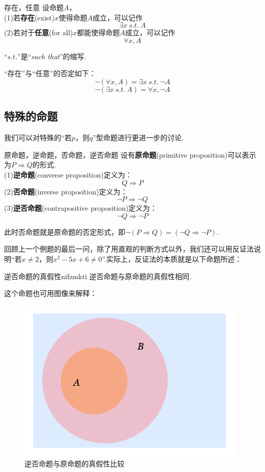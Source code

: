\documentclass[lang=cn, zihao=5]{elegantbook}
\begin{document}
\begin{definition}{存在，任意}
	设命题$A$， \\
	(1)若\textbf{存在}(exist)$x$使得命题$A$成立，可以记作$$\exists x~s.t.~A$$
	(2)若对于\textbf{任意}(for all)$x$都能使得命题$A$成立，可以记作$$\forall x,A$$
\end{definition}
\begin{remark}
	“$s.t.$”是“\textit{such that}”的缩写.
\end{remark}
\begin{remark}
	“存在”与“任意”的否定如下：
	$$\neg (\forall x,A) = \exists x~s.t.~\neg A$$
	$$\neg (\exists x~s.t.~A) = \forall x,\neg A$$
\end{remark}

\subsection{特殊的命题}

我们可以对特殊的“若$p$，则$q$”型命题进行更进一步的讨论.

\begin{definition}{原命题，逆命题，否命题，逆否命题}
	设有\textbf{原命题}(primitive proposition)可以表示为$P \Rightarrow Q$的形式. \\
	(1)\textbf{逆命题}(converse proposition)定义为：$$Q \Rightarrow P$$
	(2)\textbf{否命题}(inverse proposition)定义为：$$\neg P \Rightarrow \neg Q$$
	(3)\textbf{逆否命题}(contrapositive proposition)定义为：$$\neg Q \Rightarrow \neg P$$
\end{definition}
\begin{remark}
	此时否命题就是原命题的否定形式，即$\neg (P \Rightarrow Q) = (\neg Q \Rightarrow \neg P)$.
\end{remark}

回顾上一个例题的最后一问，除了用直观的判断方式以外，我们还可以用反证法说明“若$x \neq 2$，则$x^2-5x+6 \neq 0$”.实际上，反证法的本质就是以下命题所述：

\begin{proposition}{逆否命题的真假性}{nifzmkti}
	逆否命题与原命题的真假性相同.
\end{proposition}

这个命题也可用图像来解释：

\begin{figure}[h!]
	\centering
	\includegraphics{attachment/202302192.pdf}
	\caption{逆否命题与原命题的真假性比较}
\end{figure}
\end{document}
